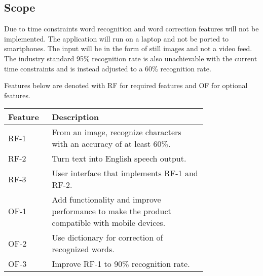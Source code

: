 \documentclass[../main.tex]{subfiles}
\begin{document}
\subsection{Scope}
Due to time constraints word recognition and word correction features will not
be implemented. The application will run on a laptop and not be ported to
smartphones. The input will be in the form of still images and not a video
feed. The industry standard 95\% recognition rate is also unachievable with
the current time constraints and is instead adjusted to a 60\% recognition
rate.

Features below are denoted with RF for required features and OF for optional
features.
  \noindent\begin{tabularx}{\linewidth}{X p{0.78\linewidth}}
  \toprule
    \textbf{Feature} & \textbf{Description} \\
  \midrule
  RF-1 &
    From an image, recognize characters with an accuracy of at least 60\%. \\
  RF-2 &
    Turn text into English speech output. \\
  RF-3 &
    User interface that implements RF-1 and RF-2. \\
  OF-1 &
    Add functionality and improve performance to make the product compatible
    with mobile devices. \\
  OF-2 &
    Use dictionary for correction of recognized words. \\
  OF-3 &
    Improve RF-1 to 90\% recognition rate. \\
  \bottomrule
  \end{tabularx}
\end{document}
